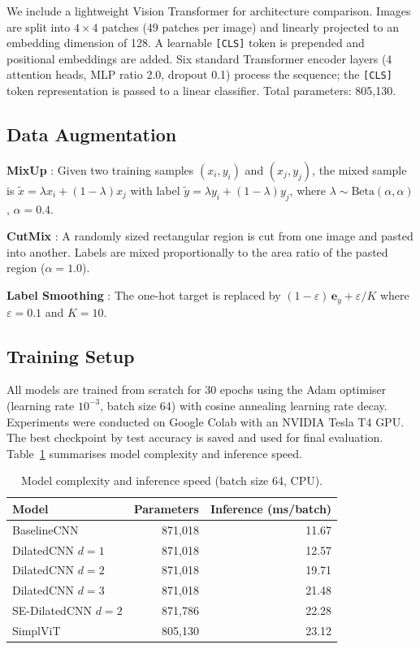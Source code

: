 \documentclass[10pt,a4paper]{article}
\begin{document}
We include a lightweight Vision Transformer for architecture comparison.
Images are split into $4\!\times\!4$ patches (49 patches per image) and linearly projected to an embedding dimension of 128.
A learnable \texttt{[CLS]} token is prepended and positional embeddings are added.
Six standard Transformer encoder layers (4 attention heads, MLP ratio 2.0, dropout 0.1) process the sequence; the \texttt{[CLS]} token representation is passed to a linear classifier.
Total parameters: 805{,}130.

\subsection{Data Augmentation}

\textbf{MixUp} \cite{mixup}: Given two training samples $(x_i, y_i)$ and $(x_j, y_j)$, the mixed sample is $\tilde{x} = \lambda x_i + (1-\lambda) x_j$ with label $\tilde{y} = \lambda y_i + (1-\lambda) y_j$, where $\lambda \sim \text{Beta}(\alpha, \alpha)$, $\alpha = 0.4$.

\textbf{CutMix} \cite{cutmix}: A randomly sized rectangular region is cut from one image and pasted into another. Labels are mixed proportionally to the area ratio of the pasted region ($\alpha = 1.0$).

\textbf{Label Smoothing} \cite{labelsmoothing}: The one-hot target is replaced by $(1-\varepsilon)\,\mathbf{e}_y + \varepsilon/K$ where $\varepsilon = 0.1$ and $K=10$.

\subsection{Training Setup}

All models are trained from scratch for 30 epochs using the Adam optimiser (learning rate $10^{-3}$, batch size 64) with cosine annealing learning rate decay.
Experiments were conducted on Google Colab with an NVIDIA Tesla T4 GPU.
The best checkpoint by test accuracy is saved and used for final evaluation.
Table~\ref{tab:complexity} summarises model complexity and inference speed.

\begin{table}[H]
  \centering
  \caption{Model complexity and inference speed (batch size 64, CPU).}
  \label{tab:complexity}
  \begin{tabular}{lrr}
    \toprule
    \textbf{Model} & \textbf{Parameters} & \textbf{Inference (ms/batch)} \\
    \midrule
    BaselineCNN        & 871,018 & 11.67 \\
    DilatedCNN $d=1$   & 871,018 & 12.57 \\
    DilatedCNN $d=2$   & 871,018 & 19.71 \\
    DilatedCNN $d=3$   & 871,018 & 21.48 \\
    SE-DilatedCNN $d=2$& 871,786 & 22.28 \\
    SimplViT           & 805,130 & 23.12 \\
    \bottomrule
  \end{tabular}
\end{table}
\end{document}
